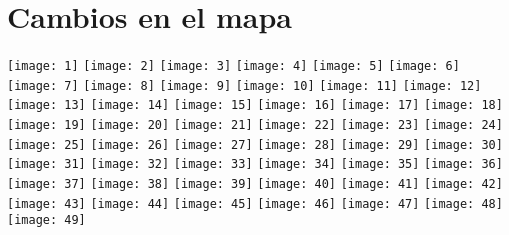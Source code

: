 \documentclass{report}
\begin{document}
\section{Cambios en el mapa}
\texttt{[image: 1]}
\texttt{[image: 2]}
\texttt{[image: 3]}
\texttt{[image: 4]}
\texttt{[image: 5]}
\texttt{[image: 6]}
\texttt{[image: 7]}
\texttt{[image: 8]}
\texttt{[image: 9]}
\texttt{[image: 10]}
\texttt{[image: 11]}
\texttt{[image: 12]}
\texttt{[image: 13]}
\texttt{[image: 14]}
\texttt{[image: 15]}
\texttt{[image: 16]}
\texttt{[image: 17]}
\texttt{[image: 18]}
\texttt{[image: 19]}
\texttt{[image: 20]}
\texttt{[image: 21]}
\texttt{[image: 22]}
\texttt{[image: 23]}
\texttt{[image: 24]}
\texttt{[image: 25]}
\texttt{[image: 26]}
\texttt{[image: 27]}
\texttt{[image: 28]}
\texttt{[image: 29]}
\texttt{[image: 30]}
\texttt{[image: 31]}
\texttt{[image: 32]}
\texttt{[image: 33]}
\texttt{[image: 34]}
\texttt{[image: 35]}
\texttt{[image: 36]}
\texttt{[image: 37]}
\texttt{[image: 38]}
\texttt{[image: 39]}
\texttt{[image: 40]}
\texttt{[image: 41]}
\texttt{[image: 42]}
\texttt{[image: 43]}
\texttt{[image: 44]}
\texttt{[image: 45]}
\texttt{[image: 46]}
\texttt{[image: 47]}
\texttt{[image: 48]}
\texttt{[image: 49]}
\end{document}
